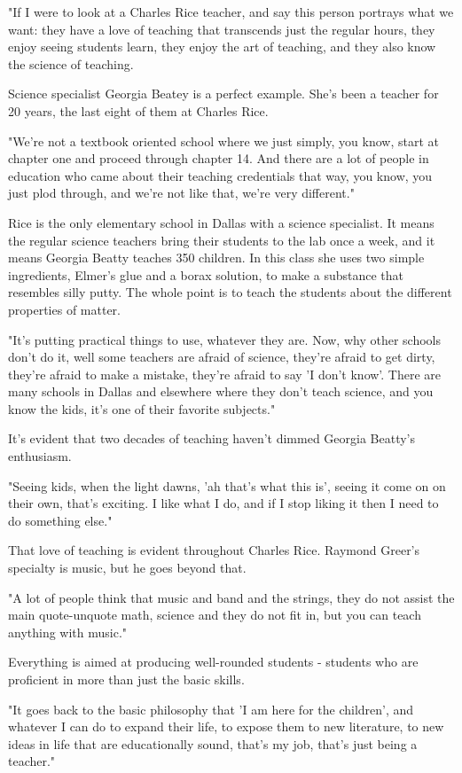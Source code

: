 "If I were to look at a Charles Rice teacher, and say this person portrays what we want: they have a love of teaching that transcends just the regular hours, they enjoy seeing students learn, they enjoy the art of teaching, and they also know the science of teaching.

Science specialist Georgia Beatey is a perfect example. She's been a teacher for 20 years, the last eight of them at Charles Rice.

"We're not a textbook oriented school where we just simply, you know, start at chapter one and proceed through chapter 14. And there are a lot of people in education who came about their teaching credentials that way, you know, you just plod through, and we're not like that, we're very different."

Rice is the only elementary school in Dallas with a science specialist. It means the regular science teachers bring their students to the lab once a week, and it means Georgia Beatty teaches 350 children. In this class she uses two simple ingredients, Elmer's glue and a borax solution, to make a substance that resembles silly putty. The whole point is to teach the students about the different properties of matter.

"It's putting practical things to use, whatever they are. Now, why other schools don't do it, well some teachers are afraid of science, they're afraid to get dirty, they're afraid to make a mistake, they're afraid to say 'I don't know'. There are many schools in Dallas and elsewhere where they don't teach science, and you know the kids, it's one of their favorite subjects."

It's evident that two decades of teaching haven't dimmed Georgia Beatty's enthusiasm.

"Seeing kids, when the light dawns, 'ah that's what this is', seeing it come on on their own, that's exciting. I like what I do, and if I stop liking it then I need to do something else."

That love of teaching is evident throughout Charles Rice. Raymond Greer's specialty is music, but he goes beyond that.

"A lot of people think that music and band and the strings, they do not assist the main quote-unquote math, science and they do not fit in, but you can teach anything with music."

Everything is aimed at producing well-rounded students - students who are proficient in more than just the basic skills.

"It goes back to the basic philosophy that 'I am here for the children', and whatever I can do to expand their life, to expose them to new literature, to new ideas in life that are educationally sound, that's my job, that's just being a teacher."

